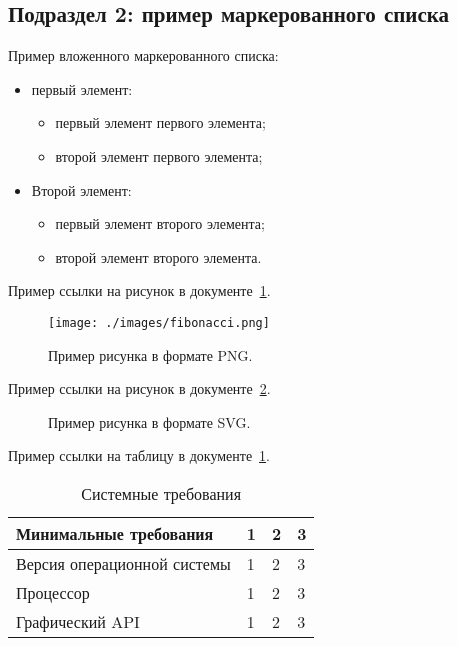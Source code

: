 \subsection{\label{subsec:ch01/sec02/sub02}Подраздел 2: пример маркерованного списка}

Пример вложенного маркерованного списка:
\begin{itemize}
\item первый элемент:
\begin{itemize}
\item первый элемент первого элемента;
\item второй элемент первого элемента;
\end{itemize}
\item Второй элемент:
\begin{itemize}
\item первый элемент второго элемента;
\item второй элемент второго элемента.
\end{itemize}
\end{itemize}

Пример ссылки на рисунок в документе~\ref{fig:example01}.
\begin{figure}[h]
    \centering
    \texttt{[image: ./images/fibonacci.png]}
    \caption{\centering\label{fig:example01}Пример рисунка в формате PNG.}
\end{figure}

Пример ссылки на рисунок в документе~\ref{fig:example02}.
\begin{figure}[h]
    \centering
    
    \caption{\centering\label{fig:example02}Пример рисунка в формате SVG.}
\end{figure}

Пример ссылки на таблицу в документе~\ref{tab:example01}.
\begin{table}[H]
\caption{\centering\label{tab:example01}Системные требования}
\begin{tabular}{|p{3 cm}|p{3 cm}|p{3 cm}|p{5 cm}|}
\hline
Минимальные требования & 1 & 2 & 3 \\ \hline
Версия операционной системы & 1 & 2 & 3 \\ \hline
Процессор & 1 & 2 & 3 \\ \hline
Графический API & 1 & 2 & 3 \\ \hline
\end{tabular}
\end{table}

